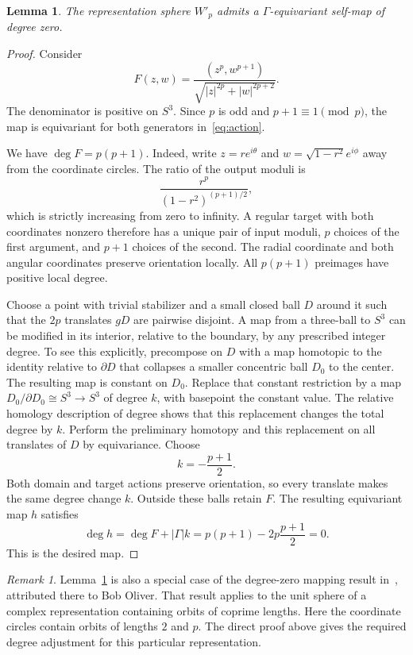 \documentclass[11pt]{amsart}
\newtheorem{lemma}[theorem]{Lemma}
\theoremstyle{definition}
\theoremstyle{remark}
\newtheorem{remark}[theorem]{Remark}
\numberwithin{equation}{section}
\begin{document}
\begin{lemma}\label{lem:degreezero}
The representation sphere $W'_p$ admits a $\Gamma$-equivariant self-map of degree zero.
\end{lemma}
\begin{proof}
Consider
\begin{equation}\label{eq:power}
 F(z,w)=\frac{(z^p,w^{p+1})}
 {\sqrt{|z|^{2p}+|w|^{2p+2}}}.
\end{equation}
The denominator is positive on $S^3$. Since $p$ is odd and $p+1\equiv1\pmod p$, the map is equivariant for both generators in~\eqref{eq:action}.

We have $\deg F=p(p+1)$. Indeed, write $z=r e^{i\theta}$ and $w=\sqrt{1-r^2}e^{i\phi}$ away from the coordinate circles. The ratio of the output moduli is
\[
 \frac{r^p}{(1-r^2)^{(p+1)/2}},
\]
which is strictly increasing from zero to infinity. A regular target with both coordinates nonzero therefore has a unique pair of input moduli, $p$ choices of the first argument, and $p+1$ choices of the second. The radial coordinate and both angular coordinates preserve orientation locally. All $p(p+1)$ preimages have positive local degree.

Choose a point with trivial stabilizer and a small closed ball $D$ around it such that the $2p$ translates $gD$ are pairwise disjoint. A map from a three-ball to $S^3$ can be modified in its interior, relative to the boundary, by any prescribed integer degree. To see this explicitly, precompose on $D$ with a map homotopic to the identity relative to $\partial D$ that collapses a smaller concentric ball $D_0$ to the center. The resulting map is constant on $D_0$. Replace that constant restriction by a map $D_0/\partial D_0\cong S^3\to S^3$ of degree $k$, with basepoint the constant value. The relative homology description of degree shows that this replacement changes the total degree by $k$. Perform the preliminary homotopy and this replacement on all translates of $D$ by equivariance. Choose
\[
 k=-\frac{p+1}{2}.
\]
Both domain and target actions preserve orientation, so every translate makes the same degree change $k$. Outside these balls retain $F$. The resulting equivariant map $h$ satisfies
\[
 \deg h=\deg F+|\Gamma|k
 =p(p+1)-2p\frac{p+1}{2}=0.
\]
This is the desired map.
\end{proof}

\begin{remark}
Lemma~\ref{lem:degreezero} is also a special case of the degree-zero mapping result in~\cite[Lemma~14]{Leary}, attributed there to Bob Oliver. That result applies to the unit sphere of a complex representation containing orbits of coprime lengths. Here the coordinate circles contain orbits of lengths $2$ and $p$. The direct proof above gives the required degree adjustment for this particular representation.
\end{remark}
\end{document}
